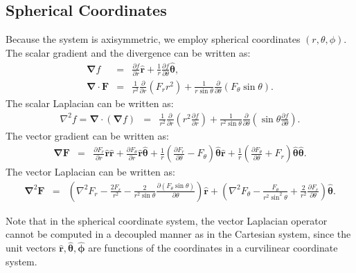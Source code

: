 \documentclass[10pt]{ijnam}
\newcommand{\deriv}[2]{\frac{\partial #1}{\partial #2}}
\newcommand{\pars}[1]{\left(#1\right)}
\newcommand\Laplacian{\nabla^2}
\newcommand\bnabla{\boldsymbol{\nabla}}
\newcommand\bLaplacian{\boldsymbol{\nabla}^2}
\newcommand\bF{\boldsymbol{F}}
\newcommand\br{\boldsymbol{r}}
\newcommand\brhat{\hat{\br}}
\newcommand\btheta{\boldsymbol{\theta}}
\newcommand\bthetahat{\hat{\btheta}}
\newcommand\bphi{\boldsymbol{\phi}}
\newcommand\bphihat{\hat{\bphi}}
\begin{document}
\subsection{Spherical Coordinates}
Because the system is axisymmetric, we employ
spherical coordinates $(r,\theta,\phi)$.
The scalar gradient and the divergence can be written as:
\begin{eqnarray*}
\bnabla f &=& \deriv{f}{r}\brhat + \frac{1}{r}\deriv{f}{\theta}\bthetahat, \\
\bnabla \cdot \bF &=& \frac{1}{r^2}\deriv{}{r}\pars{F_r r^2 } + 
               \frac{1}{r \sin\theta}\deriv{}{\theta}\pars{F_\theta \sin\theta}.
\end{eqnarray*}
The scalar Laplacian can be written as:
\begin{eqnarray*}
\Laplacian f = \bnabla \cdot (\bnabla f)&=& 
 \frac{1}{r^2}\deriv{}{r}\pars{r^2 \deriv{f}{r}} + 
 \frac{1}{r^2 \sin\theta}\deriv{}{\theta}\pars{\sin\theta \deriv{f}{\theta}}.
\end{eqnarray*}
The vector gradient can be written as:
\begin{eqnarray*}
\bnabla \bF &=& \deriv{F_r}{r} \brhat \brhat + \deriv{F_\theta}{r} \brhat \bthetahat + 
\frac{1}{r}\pars{\deriv{F_r}{\theta} - F_\theta} \bthetahat \brhat + 
\frac{1}{r}\pars{\deriv{F_\theta}{\theta} + F_r} \bthetahat \bthetahat.
\end{eqnarray*}
The vector Laplacian can be written as:
\begin{eqnarray*}
\bLaplacian \bF &=& 
\left(\Laplacian F_r - \frac{2F_r}{r^2} - 
\frac{2}{r^2 \sin\theta} \deriv{\left(F_\theta \sin\theta \right)}{\theta}\right)\brhat
+ \left(\Laplacian F_\theta - \frac{F_\theta}{r^2 \sin^2\theta} + 
\frac{2}{r^2}\deriv{F_r}{\theta}\right) \bthetahat.
\end{eqnarray*}

Note that in the spherical coordinate system,
the vector Laplacian operator cannot be computed in a decoupled manner as in the Cartesian system,
since the unit vectors $\brhat, \bthetahat, \bphihat$ are functions of the coordinates
in a curvilinear coordinate system.
\end{document}
